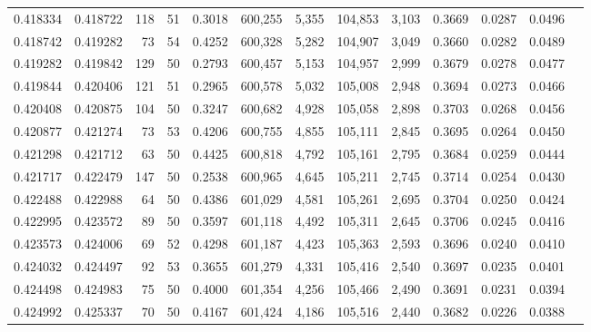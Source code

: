 \begin{tabular}{rrrrrrrrrrrrr}
0.418334 & 0.418722 &   118 &  51 &                                     0.3018 & 600,255 &   5,355 & 104,853 &   3,103 & 0.3669 & 0.0287 & 0.0496 \\
0.418742 & 0.419282 &    73 &  54 &                                     0.4252 & 600,328 &   5,282 & 104,907 &   3,049 & 0.3660 & 0.0282 & 0.0489 \\
0.419282 & 0.419842 &   129 &  50 &                                     0.2793 & 600,457 &   5,153 & 104,957 &   2,999 & 0.3679 & 0.0278 & 0.0477 \\
0.419844 & 0.420406 &   121 &  51 &                                     0.2965 & 600,578 &   5,032 & 105,008 &   2,948 & 0.3694 & 0.0273 & 0.0466 \\
0.420408 & 0.420875 &   104 &  50 &                                     0.3247 & 600,682 &   4,928 & 105,058 &   2,898 & 0.3703 & 0.0268 & 0.0456 \\
0.420877 & 0.421274 &    73 &  53 &                                     0.4206 & 600,755 &   4,855 & 105,111 &   2,845 & 0.3695 & 0.0264 & 0.0450 \\
0.421298 & 0.421712 &    63 &  50 &                                     0.4425 & 600,818 &   4,792 & 105,161 &   2,795 & 0.3684 & 0.0259 & 0.0444 \\
0.421717 & 0.422479 &   147 &  50 &                                     0.2538 & 600,965 &   4,645 & 105,211 &   2,745 & 0.3714 & 0.0254 & 0.0430 \\
0.422488 & 0.422988 &    64 &  50 &                                     0.4386 & 601,029 &   4,581 & 105,261 &   2,695 & 0.3704 & 0.0250 & 0.0424 \\
0.422995 & 0.423572 &    89 &  50 &                                     0.3597 & 601,118 &   4,492 & 105,311 &   2,645 & 0.3706 & 0.0245 & 0.0416 \\
0.423573 & 0.424006 &    69 &  52 &                                     0.4298 & 601,187 &   4,423 & 105,363 &   2,593 & 0.3696 & 0.0240 & 0.0410 \\
0.424032 & 0.424497 &    92 &  53 &                                     0.3655 & 601,279 &   4,331 & 105,416 &   2,540 & 0.3697 & 0.0235 & 0.0401 \\
0.424498 & 0.424983 &    75 &  50 &                                     0.4000 & 601,354 &   4,256 & 105,466 &   2,490 & 0.3691 & 0.0231 & 0.0394 \\
0.424992 & 0.425337 &    70 &  50 &                                     0.4167 & 601,424 &   4,186 & 105,516 &   2,440 & 0.3682 & 0.0226 & 0.0388 \\

\end{tabular}
